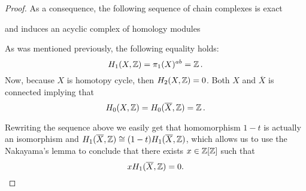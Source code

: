 \begin{proof}
  As a consequence, the following sequence of chain complexes is exact
  \begin{center}
  \end{center}
  and induces an acyclic complex of homology modules
  \begin{center}
  \end{center}
  As was mentioned previously, the following equality holds:
  $$H_1(X, \operatorname{\mathbb{Z}})=\pi_1(X)^{ab}=\operatorname{\mathbb{Z}}.$$
  Now, because $X$ is homotopy cycle, then $H_2(X, \operatorname{\mathbb{Z}})=0$. Both $X$ and $\overline{X}$ is connected implying that 
  $$H_0(X, \operatorname{\mathbb{Z}})=H_0(\overline{X}, \operatorname{\mathbb{Z}})=\operatorname{\mathbb{Z}}.$$
  \begin{center}
  \end{center}
  Rewriting the sequence above we easily get that homomorphism $1-t$ is actually an isomorphism and $H_1(\overline{X}, \operatorname{\mathbb{Z}})\cong (1-t) H_1(\overline{X}, \operatorname{\mathbb{Z}})$, which allows us to use the Nakayama's lemma to conclude that there exists $x\in\operatorname{\mathbb{Z}}[\operatorname{\mathbb{Z}}]$ such that
  $$xH_1(\overline{X}, \operatorname{\mathbb{Z}})=0.$$
\end{proof}
